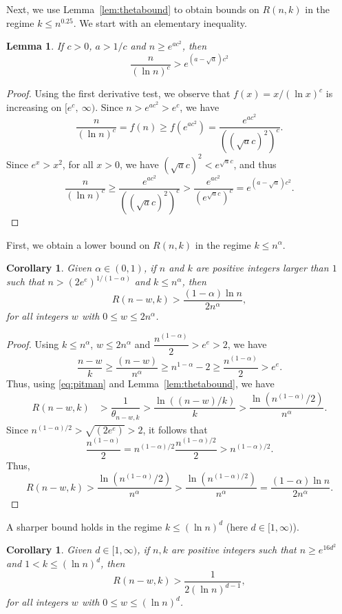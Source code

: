 \documentclass{amsart}
\newtheorem{lem}[thm]{Lemma}
\newtheorem{cor}[thm]{Corollary}
\begin{document}
Next, we use Lemma~\ref{lem:thetabound} to obtain bounds on $R(n,k)$ in the regime $k\leq n^{0.25}$. We start with an elementary inequality.

\begin{lem}\label{lem:n-lnncomp}
If $c>0$, $a >1/c$ and $n\geq e^{ac^{2}}$, then 
\[\dfrac{n}{(\ln n)^{c}}> e^{(a-\sqrt{a})c^{2}}\]
\end{lem}
\begin{proof}
Using the first derivative test, we observe that $f(x)=x/(\ln x)^{c}$ is increasing on $[e^{c},\ \infty)$. Since $n>e^{ac^{2}}>e^{c}$, we have
\[\dfrac{n}{(\ln n)^{c}}=f(n) \geq f(e^{ac^{2}})=\dfrac{e^{ac^{2}}}{((\sqrt{a}c)^{2})^{c}}.\]
Since $e^{x}> x^{2}$, for all $x>0$, we have $(\sqrt{a}c)^{2} <e^{\sqrt{a}c}$, and thus
\[\dfrac{n}{(\ln n)^{c}} \geq \dfrac{e^{ac^{2}}}{((\sqrt{a}c)^{2})^{c}} > \dfrac{e^{ac^{2}}}{(e^{\sqrt{a}c})^{c}}=e^{(a-\sqrt{a})c^{2}}.\]
\end{proof}
First, we obtain a lower bound on $R(n,k)$ in the regime $k\leq n^{\alpha}$.
\begin{cor}\label{cor:RLbound}
Given $\alpha \in (0,1)$, if $n$ and $k$ are positive integers larger than $1$ such that $n>(2 e^e)^{1/(1-\alpha)}$ and $k\leq n^{\alpha}$,
then  \[R(n-w,k)> \dfrac{(1-\alpha)\ln n}{2n^{\alpha}},\] for all integers $w$ with $0\leq w \leq 2n^{\alpha}$.
\end{cor}
\begin{proof}
Using $k\leq n^{\alpha}$, $w\leq 2n^{\alpha}$ and $\dfrac{n^{(1-\alpha)}}{2}>e^{e}>2$, we have 
\[\dfrac{n-w}{k} \geq \dfrac{(n-w)}{n^{\alpha}}\geq n^{1-\alpha}-2 \geq \dfrac{n^{(1-\alpha)}}{2}>e^{e}.\]
Thus, using \eqref{eq:pitman} and Lemma~\ref{lem:thetabound}, we have  
\begin{align*}
R(n-w,k) & > \dfrac{1}{\theta_{n-w,k}} > \dfrac{\ln((n-w)/k)}{k} >\dfrac{\ln(n^{(1-\alpha)}/2)}{n^{\alpha}}.
\end{align*}
Since $n^{(1-\alpha)/2}>\sqrt{(2e^e)}>2$, it follows that \[\dfrac{n^{(1-\alpha)}}{2}=n^{(1-\alpha)/2} \dfrac{n^{(1-\alpha)/2}}{2} > n^{(1-\alpha)/2}.\] Thus,
 \[R(n-w,k)>\dfrac{\ln(n^{(1-\alpha)}/2)}{n^{\alpha}}>\dfrac{\ln(n^{(1-\alpha)/2})}{n^{\alpha}}=\dfrac{(1-\alpha)\ln n}{2n^{\alpha}}.\]
\end{proof}
A sharper bound holds in the regime $k\leq (\ln n)^{d}$ (here $d\in[1,\infty)$).
\begin{cor}\label{cor:RLboundln}
Given $d\in [1,\infty)$, if $n,k$ are positive integers such that $n\geq e^{16d^{2}}$ and $1<k\leq (\ln n)^{d}$, then  \[R(n-w,k)>  \dfrac{1}{2(\ln n)^{d-1}},\] for all integers $w$ with $0\leq w\leq (\ln n)^{d}$.
\end{cor}
\end{document}
